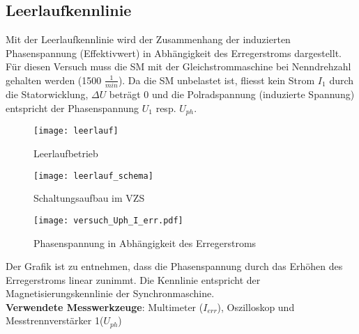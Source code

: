 \begin{flushleft}
\subsection{Leerlaufkennlinie}
Mit der Leerlaufkennlinie wird der Zusammenhang der induzierten Phasenspannung (Effektivwert) in Abhängigkeit des Erregerstroms dargestellt. Für diesen Versuch muss die SM mit der Gleichstrommaschine bei Nenndrehzahl gehalten werden (1500 $\frac{1}{min}$).
Da die SM unbelastet ist, fliesst kein Strom $I_1$ durch die Statorwicklung, $\Delta U$ beträgt 0 und die Polradspannung (induzierte Spannung) entspricht der Phasenspannung $U_1$ resp. $U_{ph}$. \\


\begin{figure}[H]
    \centering
        \texttt{[image: leerlauf]}
         \caption[]{Leerlaufbetrieb \footnotemark}
    \label{fig:abb1}
\end{figure}





\begin{figure}[H]
    \centering
        \texttt{[image: leerlauf\_schema]}
    \caption{Schaltungsaufbau im VZS}
    \label{fig:abb1}
\end{figure}









\newpage



\begin{figure}[H]
    \centering
        \texttt{[image: versuch\_Uph\_I\_err.pdf]}
    \caption{Phasenspannung in Abhängigkeit des Erregerstroms}
    \label{fig:Leerlauf}
\end{figure}



Der Grafik ist zu entnehmen, dass die Phasenspannung durch das Erhöhen des Erregerstroms linear zunimmt. 
Die Kennlinie entspricht der Magnetisierungskennlinie der Synchronmaschine.\\


\vspace{0.4cm}
\textbf{Verwendete Messwerkzeuge}: Multimeter ($I_{err}$), Oszilloskop und\\ Messtrennverstärker 1($U_{ph}$)


\end{flushleft}
